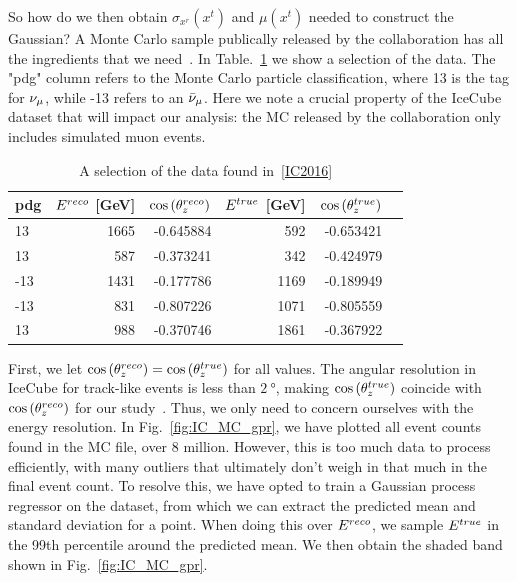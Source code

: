 So how do we then obtain $\sigma_{x^r}(x^t)$ and $\mu(x^t)$ needed to construct the Gaussian? A Monte Carlo sample publically released by the 
collaboration has all the ingredients that we need~\cite{IC2016}. In Table.~\ref{table:IC_MC} we show a selection of the data.
The "pdg" column refers to the Monte Carlo particle classification, where 13 is the tag for $\nu_\mu$, while -13 refers
to an $\bar{\nu}_\mu$. Here we note a crucial property of the IceCube dataset that will impact our analysis: the MC released by the collaboration
only includes simulated muon events.

\begin{table}[ht]
    \centering
    \begin{tabular}{lrrrrr}
        \hline \hline
        pdg &      $E^{reco}$ [\si{\GeV}] &     $\cos{(\theta_z^{reco})}$ &       $E^{true}$ [\si{\GeV}] &     $\cos{(\theta_z^{true})}$ \\
        \hline
         13 &  1665 & -0.645884 &    592 & -0.653421 \\
         13 &   587 & -0.373241 &    342 & -0.424979 \\
        -13 &  1431 & -0.177786 &   1169 & -0.189949 \\
        -13 &   831 & -0.807226 &   1071 & -0.805559 \\
         13 &   988 & -0.370746 &   1861 & -0.367922 \\
         \hline \hline
  \end{tabular}
  \caption{A selection of the data found in~\ref{IC2016}}
  \label{table:IC_MC}
\end{table}

First, we let $\cos{(\theta_z^{reco})} = \cos{(\theta_z^{true})}$ for all values. The angular resolution in IceCube for track-like events is less than $\SI{2}{\degree}$, making $\cos{(\theta_z^{true})}$ coincide with $\cos{(\theta_z^{reco})}$ for our study~\cite{IC2020}.
Thus, we only need to concern ourselves with the energy resolution.
In Fig.~\ref{fig:IC_MC_gpr}, we have plotted all event counts found in the MC file, over 8 million. However, this is too much data to process efficiently, with many outliers that ultimately don't weigh in 
that much in the final event count. To resolve this, we have opted to train a Gaussian process regressor on the dataset, from which we can extract the predicted mean and standard deviation for a point.
When doing this over $E^{reco}$, we sample $E^{true}$ in the 99th percentile around the predicted mean. We then obtain the shaded band shown in Fig.~\ref{fig:IC_MC_gpr}. %

